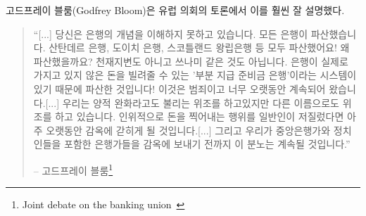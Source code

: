 \begin{comment}
	Godfrey Bloom, addressing the European Parliament during a joint
	debate, said it way better than I ever could:
\end{comment}
고드프레이 블룸(Godfrey Bloom)은 유럽 의회의 토론에서 이를 훨씬 잘 설명했다.

\begin{comment}
	\begin{quotation}\begin{samepage}
			\enquote{[...] you do not really understand the concept of banking. All the
				banks are broke. Bank Santander, Deutsche Bank, Royal Bank of
				Scotland --- they're all broke! And why are they broke? It isn't an
				act of God. It isn't some sort of tsunami. They're broke because we
				have a system called `fractional reserve banking' which means that
				banks can lend money that they don't actually have! It's a criminal
				scandal and it's been going on for too long. [...]
				We have counterfeiting --- sometimes called quantitative
				easing --- but counterfeiting by any other name. The artificial
				printing of money which, if any ordinary person did, they'd go to
				prison for a very long time [...] and until we start sending
				bankers --- and I include central bankers and politicians --- to
				prison for this outrage it will continue.}
			\begin{flushright} -- Godfrey Bloom\footnote{Joint debate on the
					banking union~\cite{godfrey-bloom}}
	\end{flushright}\end{samepage}\end{quotation}
\end{comment}
\begin{quotation}\begin{samepage}
		\enquote{[...] 당신은 은행의 개념을 이해하지 못하고 있습니다. 
			모든 은행이 파산했습니다. 산탄데르 은행, 도이치 은행, 스코틀랜드 왕립은행 등 모두 파산했어요!
			왜 파산했을까요? 천재지변도 아니고 쓰나미 같은 것도 아닙니다. 
			은행이 실제로 가지고 있지 않은 돈을 빌려줄 수 있는 '부분 지급 준비금 은행'이라는 시스템이 있기 때문에 파산한 것입니다! 
			이것은 범죄이고 너무 오랫동안 계속되어 왔습니다.[...]	
			우리는 양적 완화라고도 불리는 위조를 하고있지만 다른 이름으로도 위조를 하고 있습니다.
			인위적으로 돈을 찍어내는 행위를 일반인이 저질렀다면 아주 오랫동안 감옥에 갇히게 될 것입니다.[...] 
			그리고 우리가 중앙은행가와 정치인들을 포함한 은행가들을 감옥에 보내기 전까지 이 분노는 계속될 것입니다.}
		\begin{flushright} -- 고드프레이 블룸\footnote{Joint debate on the
				banking union~\cite{godfrey-bloom}}
\end{flushright}\end{samepage}\end{quotation}

